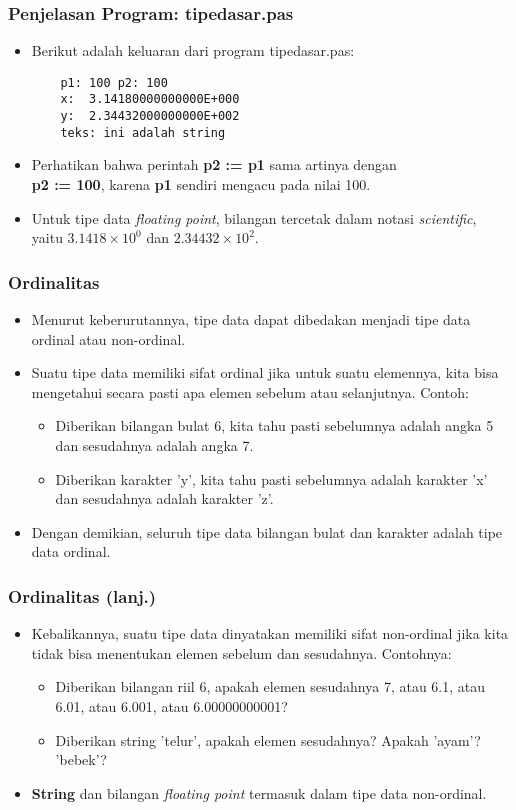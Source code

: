\documentclass{beamer}
\begin{document}
\begin{frame}[fragile]
\frametitle{Penjelasan Program: tipedasar.pas}
\begin{itemize}
	\item Berikut adalah keluaran dari program tipedasar.pas:
	\begin{lstlisting}
	p1: 100 p2: 100
	x:  3.14180000000000E+000
	y:  2.34432000000000E+002
	teks: ini adalah string
	\end{lstlisting}
	\item Perhatikan bahwa perintah \textbf{p2 := p1} sama artinya dengan \\ \textbf{p2 := 100}, karena \textbf{p1} sendiri mengacu pada nilai 100.
	\item Untuk tipe data \textit{floating point}, bilangan tercetak dalam notasi \textit{scientific}, yaitu $3.1418 \times 10^{0}$ dan $2.34432 \times 10^{2}$.
\end{itemize}
\end{frame}

\begin{frame}
\frametitle{Ordinalitas}
\begin{itemize}
	\item Menurut keberurutannya, tipe data dapat dibedakan menjadi tipe data \alert{ordinal} atau \alert{non-ordinal}.
	\item Suatu tipe data memiliki sifat ordinal jika untuk suatu elemennya, kita bisa mengetahui secara pasti apa elemen sebelum atau selanjutnya. Contoh:
	\begin{itemize}
		\item Diberikan bilangan bulat 6, kita tahu pasti sebelumnya adalah angka 5 dan sesudahnya adalah angka 7.
		\item Diberikan karakter 'y', kita tahu pasti sebelumnya adalah karakter 'x' dan sesudahnya adalah karakter 'z'.
	\end{itemize}
	\item Dengan demikian, seluruh tipe data bilangan bulat dan karakter adalah tipe data ordinal.
\end{itemize}
\end{frame}

\begin{frame}
\frametitle{Ordinalitas (lanj.)}
\begin{itemize}
	\item Kebalikannya, suatu tipe data dinyatakan memiliki sifat non-ordinal jika kita tidak bisa menentukan elemen sebelum dan sesudahnya. Contohnya:
	\begin{itemize}
		\item Diberikan bilangan riil 6, apakah elemen sesudahnya 7, atau 6.1, atau 6.01, atau 6.001, atau 6.00000000001?
		\item Diberikan string 'telur', apakah elemen sesudahnya? Apakah 'ayam'? 'bebek'?
	\end{itemize}
	\item \textbf{String} dan bilangan \textit{floating point} termasuk dalam tipe data non-ordinal.
\end{itemize}
\end{frame}
\end{document}
